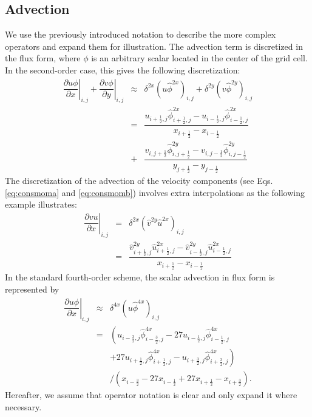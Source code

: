 \documentclass[gmd,manuscript]{copernicus}
\begin{document}
\subsection{Advection}
We use the previously introduced notation to describe the more complex operators and expand them for illustration. The advection term is discretized in the flux form, where $\phi$ is an arbitrary scalar located in the center of the grid cell. In the second-order case, this gives the following discretization:
\begin{eqnarray}
\nonumber
\left. \dfrac{\partial u \phi}{\partial x}\right|_{i,j} + \left. \dfrac{\partial v \phi}{\partial y} \right|_{i,j} & \approx & 
\delta^{2x} \left( u \widehat{\phi}^{2x} \right)_{i,j} + \delta^{2y} \left( v \widehat{\phi}^{2y} \right)_{i,j} \\ 
\nonumber
& = & \dfrac{ u_{i+\frac{1}{2},j} \widehat{\phi}^{2x}_{i+\frac{1}{2},j} - u_{i-\frac{1}{2},j} \widehat{\phi}^{2x}_{i-\frac{1}{2},j} }
            { x_{i+\frac{1}{2}} - x_{i-\frac{1}{2}} }\\
& + & \dfrac{ v_{i,j+\frac{1}{2}} \widehat{\phi}^{2y}_{i,j+\frac{1}{2}} - v_{i,j-\frac{1}{2}} \widehat{\phi}^{2y}_{i,j-\frac{1}{2}} }
            { y_{j+\frac{1}{2}} - y_{j-\frac{1}{2}} }
\end{eqnarray}
The discretization of the advection of the velocity components (see Eqs. \ref{eq:consmoma} and \ref{eq:consmomb}) involves extra interpolations as the following example illustrates:
\begin{eqnarray}
\nonumber
\left. \dfrac{\partial v u}{\partial x} \right|_{i,j} & = & \delta^{2x} \left( \widehat{v}^{2y} \widehat{u}^{2x} \right)_{i,j} \\
& = & \dfrac{ \widehat{v}^{2y}_{i+\frac{1}{2},j} \widehat{u}^{2x}_{i+\frac{1}{2},j} - \widehat{v}^{2y}_{i-\frac{1}{2},j} \widehat{u}^{2x}_{i-\frac{1}{2},j} }
      { x_{i+\frac{1}{2}} - x_{i-\frac{1}{2}} }\label{eq:advec2u}
\end{eqnarray}
In the standard fourth-order scheme, the scalar advection in flux form is represented by
\begin{eqnarray}
\nonumber
\left. \dfrac{\partial u \phi}{\partial x} \right|_{i,j} & \approx & \delta^{4x} \left( u \widehat{\phi}^{4x} \right)_{i,j} \\
\nonumber
& = & \left( u_{i-\frac{3}{2},j} \widehat{\phi}^{4x}_{i-\frac{3}{2},j} - 27 u_{i-\frac{1}{2},j} \widehat{\phi}^{4x}_{i-\frac{1}{2},j} \right.\\
\nonumber
&   &\left. + 27 u_{i+\frac{1}{2},j} \widehat{\phi}^{4x}_{i+\frac{1}{2},j} - u_{i+\frac{3}{2},j} \widehat{\phi}^{4x}_{i+\frac{3}{2},j} \right)\\
&   &\slash \left( x_{i-\frac{3}{2}} - 27 x_{i-\frac{1}{2}} + 27 x_{i+\frac{1}{2}} - x_{i+\frac{3}{2}} \right).
\end{eqnarray}
Hereafter, we assume that operator notation is clear and only expand it where necessary.
\end{document}
